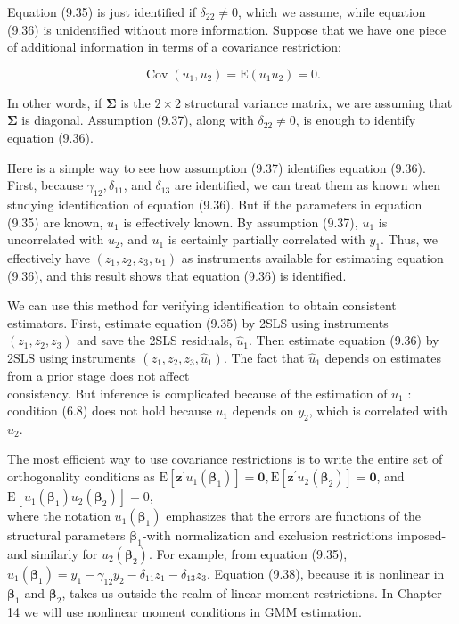 \documentclass[10pt]{article}
\begin{document}
Equation (9.35) is just identified if $\delta_{22} \neq 0$, which we assume, while equation (9.36) is unidentified without more information. Suppose that we have one piece of additional information in terms of a covariance restriction:


\begin{equation*}
\operatorname{Cov}\left(u_{1}, u_{2}\right)=\mathrm{E}\left(u_{1} u_{2}\right)=0 . \tag{9.37}
\end{equation*}


In other words, if $\boldsymbol{\Sigma}$ is the $2 \times 2$ structural variance matrix, we are assuming that $\boldsymbol{\Sigma}$ is diagonal. Assumption (9.37), along with $\delta_{22} \neq 0$, is enough to identify equation (9.36).

Here is a simple way to see how assumption (9.37) identifies equation (9.36). First, because $\gamma_{12}, \delta_{11}$, and $\delta_{13}$ are identified, we can treat them as known when studying identification of equation (9.36). But if the parameters in equation (9.35) are known, $u_{1}$ is effectively known. By assumption (9.37), $u_{1}$ is uncorrelated with $u_{2}$, and $u_{1}$ is certainly partially correlated with $y_{1}$. Thus, we effectively have $\left(z_{1}, z_{2}, z_{3}, u_{1}\right)$ as instruments available for estimating equation (9.36), and this result shows that equation (9.36) is identified.

We can use this method for verifying identification to obtain consistent estimators. First, estimate equation (9.35) by 2SLS using instruments $\left(z_{1}, z_{2}, z_{3}\right)$ and save the 2SLS residuals, $\hat{u}_{1}$. Then estimate equation (9.36) by 2SLS using instruments $\left(z_{1}, z_{2}, z_{3}, \hat{u}_{1}\right)$. The fact that $\hat{u}_{1}$ depends on estimates from a prior stage does not affect\\
consistency. But inference is complicated because of the estimation of $u_{1}$ : condition (6.8) does not hold because $u_{1}$ depends on $y_{2}$, which is correlated with $u_{2}$.

The most efficient way to use covariance restrictions is to write the entire set of orthogonality conditions as $\mathrm{E}\left[\mathbf{z}^{\prime} u_{1}\left(\boldsymbol{\beta}_{1}\right)\right]=\mathbf{0}, \mathrm{E}\left[\mathbf{z}^{\prime} u_{2}\left(\boldsymbol{\beta}_{2}\right)\right]=\mathbf{0}$, and\\
$\mathrm{E}\left[u_{1}\left(\boldsymbol{\beta}_{1}\right) u_{2}\left(\boldsymbol{\beta}_{2}\right)\right]=0$,\\
where the notation $u_{1}\left(\boldsymbol{\beta}_{1}\right)$ emphasizes that the errors are functions of the structural parameters $\boldsymbol{\beta}_{1}$-with normalization and exclusion restrictions imposed-and similarly for $u_{2}\left(\boldsymbol{\beta}_{2}\right)$. For example, from equation (9.35), $u_{1}\left(\boldsymbol{\beta}_{1}\right)=y_{1}-\gamma_{12} y_{2}-\delta_{11} z_{1}- \delta_{13} z_{3}$. Equation (9.38), because it is nonlinear in $\boldsymbol{\beta}_{1}$ and $\boldsymbol{\beta}_{2}$, takes us outside the realm of linear moment restrictions. In Chapter 14 we will use nonlinear moment conditions in GMM estimation.
\end{document}
